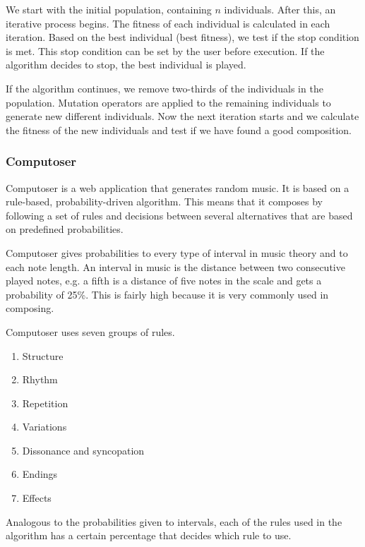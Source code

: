 \documentclass[12pt]{article}
\begin{document}
We start with the initial population, containing $n$ individuals. After this, an iterative process begins. The fitness of each individual is calculated in each iteration. Based on the best individual (best fitness), we test if the stop condition is met. This stop condition can be set by the user before execution. If the algorithm decides to stop, the best individual is played.

If the algorithm continues, we remove two-thirds of the individuals in the population. Mutation operators are applied to the remaining individuals to generate new different individuals. Now the next iteration starts and we calculate the fitness of the new individuals and test if we have found a good composition.

\subsubsection{Computoser}

Computoser is a web application that generates random music. It is based on a rule-based, probability-driven algorithm. This means that it composes by following a set of rules and decisions between several alternatives that are based on predefined probabilities.
\newline

Computoser gives probabilities to every type of interval in music theory and to each note length.
An interval in music is the distance between two consecutive played notes, e.g. a fifth is a distance of five notes in the scale and gets a probability of 25\%. This is fairly high because it is very commonly used in composing.
\newline

Computoser uses seven groups of rules.
\begin{enumerate}
\item Structure
\item Rhythm
\item Repetition
\item Variations
\item Dissonance and syncopation
\item Endings
\item Effects
\end{enumerate}

Analogous to the probabilities given to intervals, each of the rules used in the algorithm has a certain percentage that decides which rule to use.
\newline
\end{document}
